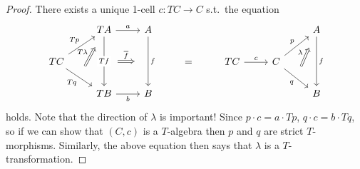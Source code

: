 \documentclass[a4paper,11pt,oneside,openany]{scrbook}
\begin{document}
\begin{proof}
    There exists a unique 1-cell $c\colon TC\rightarrow C$ s.t.\ the equation
    \[\begin{tikzcd}
        & TA & A &&&& A \\
        TC &&& {=} & TC & C \\
        & TB & B &&&& B
        \arrow[""{name=0, anchor=center, inner sep=0}, "Tq"', from=2-1, to=3-2]
        \arrow["b"', from=3-2, to=3-3]
        \arrow[""{name=1, anchor=center, inner sep=0}, "f", from=1-3, to=3-3]
        \arrow[""{name=2, anchor=center, inner sep=0}, "Tf"{description}, from=1-2, to=3-2]
        \arrow["a", from=1-2, to=1-3]
        \arrow["Tp", from=2-1, to=1-2]
        \arrow["f", from=1-7, to=3-7]
        \arrow[""{name=3, anchor=center, inner sep=0}, "q"', from=2-6, to=3-7]
        \arrow["p", from=2-6, to=1-7]
        \arrow["c", from=2-5, to=2-6]
        \arrow["T\lambda", shorten <=12pt, shorten >=12pt, Rightarrow, from=0, to=1-2]
        \arrow["{\overline{f}}", shorten <=13pt, shorten >=13pt, Rightarrow, from=2, to=1]
        \arrow["\lambda", shorten <=12pt, shorten >=12pt, Rightarrow, from=3, to=1-7]
    \end{tikzcd}\]
    holds. Note that the direction of $\lambda$ is important! Since $p\cdot
    c=a\cdot Tp$, $q\cdot c=b\cdot Tq$, so if we can show that $(C,c)$ is a
    $T$-algebra then $p$ and $q$ are strict $T$-morphisms. Similarly, the above
    equation then says that $\lambda$ is a $T$-transformation.


\end{proof}
\end{document}
